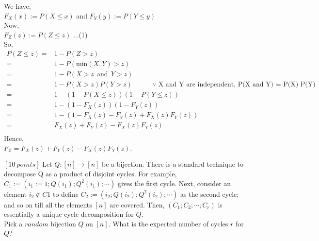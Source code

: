 \documentclass[12pt]{article}
\begin{document}
    \begin{solution}
        We have,\\
        $F_X(x) := P(X \leq x)$ and $F_Y(y) := P(Y \leq y)$\\
        Now,\\
        $F_Z(z) := P(Z \leq z)$     ...(1)\\
        So,
        \begin{align*}
            P(Z \leq z) = & 1 - P(Z > z)\\
            =& 1 - P(\text{min}(X,Y) > z)\\
            =& 1 - P(X > z \:\:\text{and}\:\: Y > z)\\
            =& 1 - P(X > z)P(Y > z)\quad\quad\quad\text{$\because$ X and Y are independent, P(X and Y) = P(X) P(Y)}\\
            =& 1 - (1-P(X\leq z)) (1-P(Y \leq z))\\
            =& 1 - (1-F_X(z))(1-F_Y(z))\\ 
            =& 1 - (1-F_X(z)-F_Y(z)+F_X(z)F_Y(z))\\
            =& F_X(z)+F_Y(z)-F_X(z)F_Y(z)\\
        \end{align*}
        Hence,\\
        $F_Z = F_X(z)+F_Y(z)-F_X(z)F_Y(z)$.
    \end{solution}

    \begin{question}
        $[10 \: points]$ Let $Q : [n] \rightarrow [n]$ be a bijection. There is a standard technique to decompose Q as a product of disjoint cycles. For example, $C_1 := (i_1 := 1;Q(i_1);Q^2(i_1);\cdots)$ gives the first cycle. Next, consider an element $i_2 \notin C1$ to define $C_2 := (i_2;Q(i_2);Q^2(i_2); \cdots)$ as the second cycle; and so on till all the elements $[n]$ are covered. Then, $(C_1;C_2;\cdots;C_r)$ is essentially a unique cycle decomposition for $Q$.\\
        Pick a $random$ bijection $Q$ on $[n]$. What is the expected number of cycles $r$ for $Q$?
    \end{question}
\end{document}
